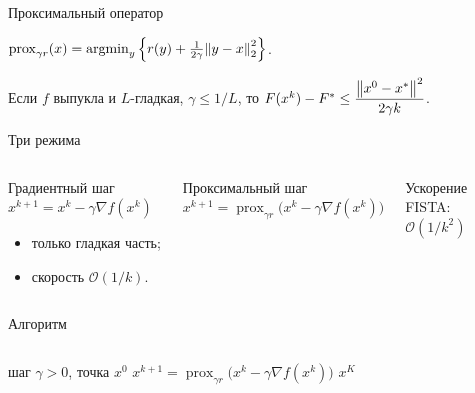 \documentclass[aspectratio=169,12pt]{beamer}
\begin{document}
\begin{frame}{Проксимальный оператор}
  \begin{defn}
    $\operatorname{prox}_{\gamma r}(x) = \operatorname*{argmin}_{y} \left\{ r(y) + \frac{1}{2\gamma}\norm{y - x}^2_2 \right\}$.
  \end{defn}
  \begin{thm}
    Если $f$ выпукла и $L$-гладкая, $\gamma \le 1/L$, то
    $F(x^k) - F^* \le \dfrac{\norm{x^0 - x^*}^2}{2\gamma k}$.
  \end{thm}
\end{frame}

\begin{frame}{Три режима}
  \begin{columns}[T,onlytextwidth]
      \begin{card}[height=4.6cm]{Градиентный шаг}
        $x^{k+1} = x^k - \gamma \nabla f(x^k)$
        \begin{itemize}
          \item только гладкая часть;
          \item скорость $\mathcal{O}(1/k)$.
        \end{itemize}
      \end{card}
      \begin{card}{Проксимальный шаг}
        $x^{k+1} = \operatorname{prox}_{\gamma r}\bigl(x^k - \gamma \nabla f(x^k)\bigr)$
      \end{card}
      \begin{cardgold}{Ускорение}
        FISTA: $\mathcal{O}(1/k^2)$ \cmark
      \end{cardgold}
  \end{columns}
\end{frame}

\begin{frame}{Алгоритм}
  \begin{columns}[c,onlytextwidth]
    \begin{algorithm}[H]
      \caption{Проксимальный градиентный метод}
      \begin{algorithmic}[1]
        \Require шаг $\gamma > 0$, точка $x^0$
          \State $x^{k+1} = \operatorname{prox}_{\gamma r}\bigl(x^k - \gamma \nabla f(x^k)\bigr)$
        \EndFor
        \Ensure $x^K$
      \end{algorithmic}
    \end{algorithm}
    \centering
  \end{columns}
\end{frame}
\end{document}
